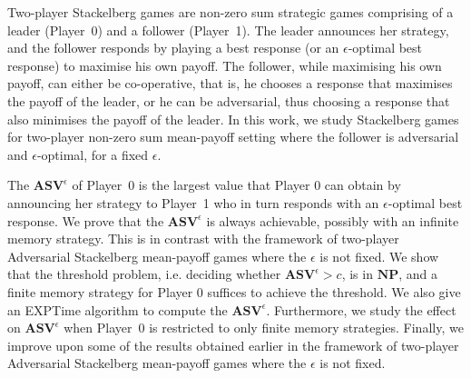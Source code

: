 Two-player Stackelberg games are non-zero sum strategic games comprising of a leader (Player~0) and a follower (Player~1). The leader announces her strategy, and the follower responds by playing a best response (or an $\epsilon$-optimal best response) to maximise his own payoff. The follower, while maximising his own payoff, can either be co-operative, that is, he chooses a response that maximises the payoff of the leader, or he can be adversarial, thus choosing a response that also minimises the payoff of the leader. In this work, we study Stackelberg games for two-player non-zero sum mean-payoff setting where the follower is adversarial and $\epsilon$-optimal, for a fixed $\epsilon$.

The $\mathbf{ASV}^{\epsilon}$ of Player~0 is the largest value that Player 0 can obtain by announcing her strategy to Player~1 who in turn responds with an $\epsilon$-optimal best response.
We prove that the $\mathbf{ASV}^{\epsilon}$ is always achievable, possibly with an infinite memory strategy.
This is in contrast with the framework of two-player Adversarial Stackelberg mean-payoff games where the $\epsilon$ is not fixed.
We show that the threshold problem, i.e. deciding whether $\mathbf{ASV}^{\epsilon} > c$, is in $\textbf{NP}$, and a finite memory strategy for Player 0 suffices to achieve the threshold.
We also give an {\sf EXPTime} algorithm to compute the $\mathbf{ASV}^{\epsilon}$.
Furthermore, we study the effect on $\mathbf{ASV}^{\epsilon}$ when Player~0 is restricted to only finite memory strategies.
Finally, we improve upon some of the results obtained earlier in the framework of two-player Adversarial Stackelberg mean-payoff games where the $\epsilon$ is not fixed.